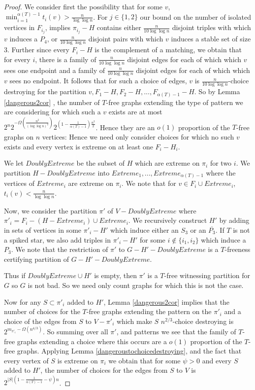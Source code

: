 \documentclass[12pt]{article}
\theoremstyle{definition}
\begin{document}
\begin{proof}
We consider first the possibility that for some $v$, $\min_{i=1}^{\alpha(T)-1} t_i(v)> \frac{n}{\log \log n}$. 
For $j \in \{1,2\}$  our bound on the number of isolated vertices   in $F_{i_j}$, implies   $\pi_{i_j}-H$ contains either 
 $\frac{n}{10 \log \log n}$ disjoint triples with which $v$ induces a $P_4$,   or 
$\frac{n}{10 \log \log n}$ disjoint pairs  with which $v$  induces a stable set of size 3. 
Further since every $F_i-H$ is the complement of a matching, we obtain that for every $i$,
there is a family of  $\frac{n}{10 \log \log n}$ disjoint edges for  each of which which $v$ sees one endpoint and 
a family of $\frac{n}{10 \log \log n}$ disjoint  edges for  each of which which $v$ sees no  endpoint.
 It follows that  for such a choice of edges, $v$ is
$\frac{n}{10 \log \log n}$-choice destroying  for the partition $v,F_1-H,F_2-H,...,F_{\alpha(T)-1}-H$. 
So by Lemma \ref{dangerous2cor} , the  number  of $T$-free graphs  extending the type of pattern we are considering  for which such a $v$ exists are  at most 
$2^n2^{-\Omega(\frac{n^2}{(\log \log n)^2})}2^{(1-\frac{1}{\alpha(T)-1})\frac{n^2}{2}}$. Hence they are     an $o(1)$ proportion of the $T$-free graphs on $n$ vertices: Hence we need only consider choices for which no such $v$ exists and every vertex is extreme on at least one $F_i-H_i$. 

We let $DoublyExtreme$ be the subset of $H$ which are extreme on $\pi_i$ for two $i$. 
We partition $H -DoublyExtreme$ into $Extreme_1,...,Extreme_{\alpha(T)-1}$ where the vertices of $Extreme_i$ are extreme on $\pi_i$.
We note that for $v \in  F_i \cup Extreme_i$, $t_i(v)<\frac{n}{\log \log n}$. 


Now, we consider the partition $ \pi'$  of $V-DoublyExtreme$ where $\pi'_i=F_i-(H -Extreme_i) \cup Extreme_i$. 
We recursively construct $H'$ by adding in sets of vertices in some $\pi'_i -H'$ which induce either 
an $S_3$ or an $\overline{P_3}$. If $T$ is not a spiked star, we also add triples in $\pi'_i-H'$ for some $i \not \in \{i_1,i_2\}$ which induce a 
$P_3$. We note that the restriction of $\pi'$ to $G-H'-DoublyExtreme$ is a $T$-freeness certifying partition of $G-H'-DoublyExtreme$. 

Thus  if  $DoublyExtreme \cup H'$ is empty, then $\pi'$ is a $T$-free witnessing partition 
for $G$ so $G$ is not bad. So we need only count graphs for which this is not the case. 

Now  for any $S \subset \pi'_i$ added to $H'$,  Lemma \ref{dangerous2cor}  implies that the number of  choices for the $T$-free graphs extending  the pattern on the $\pi'_i$ 
and a choice of the edges from $S$ to $V-\pi'_i$  which make  $S$ $n^{2/3}$-choice destroying is $2^{m_{\pi'_i}-\Omega(n^{4/3})}$. 
So summing over all $\pi'$, and patterns we see that the family of $T$-free graphs extending a choice where this occurs are a $o(1)$  proportion of the $T$-free graphs.
Applying Lemma \ref{dangeroustochoicedestroying},  and the fact that every vertex of $S$ is extreme on $\pi_i$ we obtain that  for  some $\psi>0$ and  every $S$ added to $H'$,  the number of choices for the edges from $S$ to $V$ 
is $2^{|S|(1-\frac{1}{\alpha(T)-1} -\psi)n}$. 



\end{proof}
\end{document}
